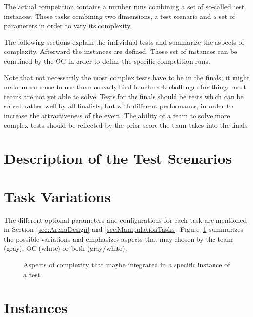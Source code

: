 
The actual competition contains a number runs combining a set of so-called
test instances. These tasks combining two dimensions, a test scenario and a
set of parameters in order to vary its complexity.

The following sections explain the individual tests and summarize the aspects of
complexity. Afterward the instances are defined. These set of instances can
be combined by the OC in order to define the specific competition runs.

Note that not necessarily the most complex tests have to be in the finals;
it might make more sense to use them as early-bird benchmark challenges for
things most teams are not yet able to solve. Tests for the finals should be
tests which can be solved rather well by all finalists, but with different
performance, in order to increase the attractiveness of the event. The ability
of a team to solve more complex tests should be reflected by the prior score
the team takes into the finals

\section{Description of the Test Scenarios}











\newpage
\section{Task Variations}

The different optional parameters and configurations for each task are 
mentioned in Section~\ref{sec:ArenaDesign} and \ref{sec:ManipulationTasks}. 
Figure~\ref{fig:complexityTree} summarizes the possible variations and 
emphasizes aspects that may chosen by the team (gray), OC (white) or both 
(gray/white).

\begin{figure}[ht]
\centering

\caption{Aspects of complexity that maybe integrated in a specific instance of a test.}
\label{fig:complexityTree}
\end{figure}


\section{Instances}

